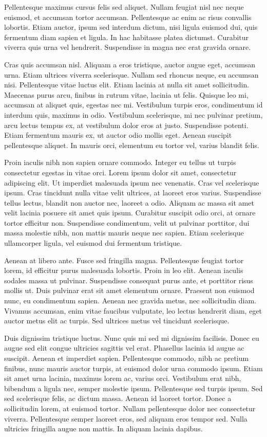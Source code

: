 Pellentesque maximus cursus felis sed aliquet. Nullam feugiat nisl nec neque euismod, et accumsan tortor accumsan. Pellentesque ac enim ac risus convallis lobortis. Etiam auctor, ipsum sed interdum dictum, nisi ligula euismod dui, quis fermentum diam sapien et ligula. In hac habitasse platea dictumst. Curabitur viverra quis urna vel hendrerit. Suspendisse in magna nec erat gravida ornare.

Cras quis accumsan nisl. Aliquam a eros tristique, auctor augue eget, accumsan urna. Etiam ultrices viverra scelerisque. Nullam sed rhoncus neque, eu accumsan nisi. Pellentesque vitae luctus elit. Etiam lacinia at nulla sit amet sollicitudin. Maecenas purus arcu, finibus in rutrum vitae, lacinia ut felis. Quisque leo mi, accumsan at aliquet quis, egestas nec mi. Vestibulum turpis eros, condimentum id interdum quis, maximus in odio. Vestibulum scelerisque, mi nec pulvinar pretium, arcu lectus tempus ex, at vestibulum dolor eros at justo. Suspendisse potenti. Etiam fermentum mauris ex, ut auctor odio mollis eget. Aenean suscipit pellentesque aliquet. In mauris orci, elementum eu tortor vel, varius blandit felis.

Proin iaculis nibh non sapien ornare commodo. Integer eu tellus ut turpis consectetur egestas in vitae orci. Lorem ipsum dolor sit amet, consectetur adipiscing elit. Ut imperdiet malesuada ipsum nec venenatis. Cras vel scelerisque ipsum. Cras tincidunt nulla vitae velit ultrices, at laoreet eros varius. Suspendisse tellus lectus, blandit non auctor nec, laoreet a odio. Aliquam ac massa sit amet velit lacinia posuere sit amet quis ipsum. Curabitur suscipit odio orci, at ornare tortor efficitur non. Suspendisse condimentum, velit ut pulvinar porttitor, dui massa molestie nibh, non mattis mauris neque nec sapien. Etiam scelerisque ullamcorper ligula, vel euismod dui fermentum tristique.

Aenean at libero ante. Fusce sed fringilla magna. Pellentesque feugiat tortor lorem, id efficitur purus malesuada lobortis. Proin in leo elit. Aenean iaculis sodales massa ut pulvinar. Suspendisse consequat purus ante, et porttitor risus mollis ut. Duis pulvinar erat sit amet elementum ornare. Praesent non euismod nunc, eu condimentum sapien. Aenean nec gravida metus, nec sollicitudin diam. Vivamus accumsan, enim vitae faucibus vulputate, leo lectus hendrerit diam, eget auctor metus elit ac turpis. Sed ultrices metus vel tincidunt scelerisque.

Duis dignissim tristique luctus. Nunc quis mi sed mi dignissim facilisis. Donec eu augue sed elit congue ultricies sagittis vel erat. Phasellus lacinia id augue ac suscipit. Aenean et imperdiet sapien. Pellentesque commodo, nibh ac pretium finibus, nunc mauris auctor turpis, at euismod dolor urna commodo ipsum. Etiam sit amet urna lacinia, maximus lorem ac, varius orci. Vestibulum erat nibh, bibendum a ligula nec, semper molestie ipsum. Pellentesque sed turpis ipsum. Sed sed scelerisque felis, ac dictum massa. Aenean id laoreet tortor. Donec a sollicitudin lorem, at euismod tortor. Nullam pellentesque dolor nec consectetur viverra. Pellentesque semper laoreet eros, sed aliquam eros tempor sed. Nulla ultricies fringilla augue non mattis. In aliquam lacinia dapibus.

